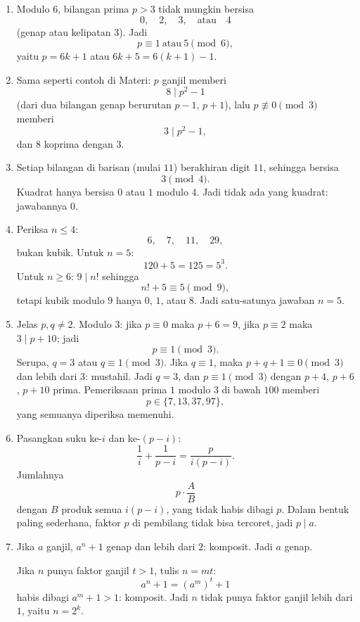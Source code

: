 \documentclass[12pt]{scrartcl}
\begin{document}
\begin{enumerate}[resume]
	Untuk $n = 1$ bilangannya negatif.
	Tinggal $n = 2$ yang memberi $2$, $3$, $7$, semuanya prima.

	\item Modulo $6$, bilangan prima $p > 3$ tidak mungkin bersisa
	\[ 0, \quad 2, \quad 3, \quad \text{atau} \quad 4 \]
	(genap atau kelipatan $3$).
	Jadi
	\[ p \equiv 1 \ \text{atau} \ 5 \pmod{6}, \]
	yaitu $p = 6k + 1$ atau $6k + 5 = 6(k+1) - 1$.

	\item Sama seperti contoh di Materi: $p$ ganjil memberi
	\[ 8 \mid p^2 - 1 \]
	(dari dua bilangan genap berurutan $p - 1$, $p + 1$),
	lalu $p \not\equiv 0 \pmod{3}$ memberi
	\[ 3 \mid p^2 - 1, \]
	dan $8$ koprima dengan $3$.

	\item Setiap bilangan di barisan (mulai $11$) berakhiran digit $11$,
	sehingga bersisa
	\[ 3 \pmod{4}. \]
	Kuadrat hanya bersisa $0$ atau $1$ modulo $4$.
	Jadi tidak ada yang kuadrat: jawabannya $0$.

	\item Periksa $n \le 4$:
	\[ 6, \quad 7, \quad 11, \quad 29, \]
	bukan kubik.
	Untuk $n = 5$:
	\[ 120 + 5 = 125 = 5^3. \]
	Untuk $n \ge 6$: $9 \mid n!$ sehingga
	\[ n! + 5 \equiv 5 \pmod{9}, \]
	tetapi kubik modulo $9$ hanya $0$, $1$, atau $8$.
	Jadi satu-satunya jawaban $n = 5$.

	\item Jelas $p, q \ne 2$. Modulo $3$: jika $p \equiv 0$ maka $p + 6 = 9$,
	jika $p \equiv 2$ maka $3 \mid p + 10$; jadi
	\[ p \equiv 1 \pmod{3}. \]
	Serupa, $q = 3$ atau $q \equiv 1 \pmod{3}$.
	Jika $q \equiv 1$, maka $p + q + 1 \equiv 0 \pmod{3}$ dan lebih dari $3$: mustahil.
	Jadi $q = 3$, dan $p \equiv 1 \pmod{3}$ dengan $p + 4$, $p + 6$, $p + 10$ prima.
	Pemeriksaan prima $1$ modulo $3$ di bawah $100$ memberi
	\[ p \in \{7, 13, 37, 97\}, \]
	yang semuanya diperiksa memenuhi.

	\item Pasangkan suku ke-$i$ dan ke-$(p-i)$:
	\[ \frac{1}{i} + \frac{1}{p-i} = \frac{p}{i(p-i)}. \]
	Jumlahnya
	\[ p \cdot \frac{A}{B} \]
	dengan $B$ produk semua $i(p-i)$, yang tidak habis dibagi $p$.
	Dalam bentuk paling sederhana, faktor $p$ di pembilang tidak bisa tercoret,
	jadi $p \mid a$.

	\item Jika $a$ ganjil, $a^n + 1$ genap dan lebih dari $2$: komposit.
	Jadi $a$ genap.

	Jika $n$ punya faktor ganjil $t > 1$, tulis $n = mt$:
	\[ a^n + 1 = (a^m)^t + 1 \]
	habis dibagi $a^m + 1 > 1$: komposit.
	Jadi $n$ tidak punya faktor ganjil lebih dari $1$, yaitu $n = 2^k$.


\end{enumerate}
\end{document}
